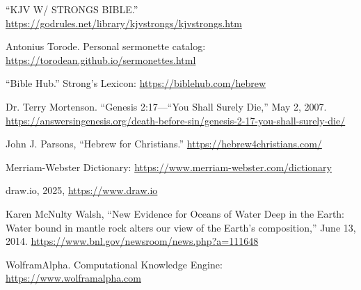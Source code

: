 {\footnotesize
\begin{thebibliography}{99}
	
	 ``KJV W/ STRONGS BIBLE.'' \url{https://godrules.net/library/kjvstrongs/kjvstrongs.htm}
	
	 Antonius Torode. Personal sermonette catalog: \url{https://torodean.github.io/sermonettes.html}
	
	 ``Bible Hub.'' Strong's Lexicon: \url{https://biblehub.com/hebrew}
	
	 Dr. Terry Mortenson. ``Genesis 2:17—“You Shall Surely Die,'' May 2, 2007.  \url{https://answersingenesis.org/death-before-sin/genesis-2-17-you-shall-surely-die/}
	
	 John J. Parsons, ``Hebrew for Christians.'' \url{https://hebrew4christians.com/}
	
	 Merriam-Webster Dictionary: \url{https://www.merriam-webster.com/dictionary}
	
	 draw.io, 2025, \url{https://www.draw.io}
	
	 Karen McNulty Walsh, ``New Evidence for Oceans of Water Deep in the Earth: Water bound in mantle rock alters our view of the Earth's composition,'' June 13, 2014. \url{https://www.bnl.gov/newsroom/news.php?a=111648}
	
	 WolframAlpha. Computational Knowledge Engine: \url{https://www.wolframalpha.com}
	
\end{thebibliography}
}